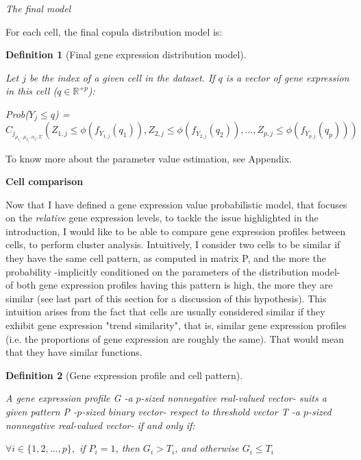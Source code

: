 \documentclass{report}
\newtheorem{definition}{Definition}[section]
\begin{document}
{\bigskip
\noindent \textit{The final model}
\bigskip

For each cell, the final copula distribution model is:

\begin{definition}[Final gene expression distribution model]\label{cellcopula}{Let $j$ be the index of a given cell in the dataset. If $q$ is a vector of gene expression in this cell ($q \in \mathbb{R}^{+p}$):\begin{center} 
\textit{Prob}($Y_j \leq q$) = $C_j_{\mu_1_j, \mu_2_j, \alpha_j, \Sigma}(Z_{1,j} \leq \phi(f_{Y_{1,j}}(q_1)), Z_{2,j} \leq \phi(f_{Y_{2,j}}(q_2)), ..., Z_{p,j} \leq \phi(f_{Y_{p,j}}(q_p)))$\end{center}}\end{definition}

To know more about the parameter value estimation, see Appendix.

\bigskip
\noindent \textbf{Cell comparison}
\bigskip

Now that I have defined a gene expression value probabilistic model, that focuses on the \emph{relative} gene expression levels, to tackle the issue highlighted in the introduction, I would like to be able to compare gene expression profiles between cells, to perform cluster analysis. Intuitively, I consider two cells to be similar if they have the same cell pattern, as computed in matrix P, and the more the probability -implicitly conditioned on the parameters of the distribution model- of both gene expression profiles having this pattern is high, the more they are similar (see last part of this section for a discussion of this hypothesis). This intuition arises from the fact that cells are usually considered similar if they exhibit gene expression "trend similarity"\cite{jaskowiak2014selection}, that is, similar gene expression profiles (i.e. the proportions of gene expression are roughly the same). That would mean that they have similar functions.\\

\begin{definition}[Gene expression profile and cell pattern]\label{profilepattern}{A gene expression profile G -a $p$-sized nonnegative real-valued vector- suits a given pattern P -$p$-sized binary vector- respect to threshold vector T -a $p$-sized nonnegative real-valued vector- if and only if:\begin{center}
$\forall i \in \{1,2,...,p\},$ if $P_i = 1$, then $G_i > T_i$, and otherwise $G_i \leq T_i$\end{center}}\end{definition}

}
\end{document}
